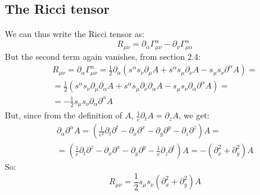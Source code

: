 \documentclass{article}
\begin{document}
\subsection{The Ricci tensor}
We can thus write the Ricci tensor as:
\begin{equation}
    R_{\mu\nu} =
    \partial_\alpha \Gamma^\alpha_{\mu\nu}
    - \partial_\nu \Gamma^\alpha_{\mu\alpha}
\end{equation}
But the second term again vanishes, from section 2.4:
\begin{equation}
\begin{gathered}
    R_{\mu\nu} = 
    \partial_\alpha \Gamma^\alpha_{\mu\nu}
    =
    \frac{1}{2}
    \partial_\alpha \left(
        s^\alpha s_\nu \partial_\mu A 
        + s^\alpha s_\mu \partial_\nu A 
        - s_\mu s_\nu \partial^\alpha A 
    \right) = \\ =
    \frac{1}{2}
    \left(
        s^\alpha s_\nu \partial_\mu \partial_\alpha A 
        + s^\alpha s_\mu \partial_\nu \partial_\alpha  A 
        - s_\mu s_\nu \partial_\alpha \partial^\alpha A 
    \right) = \\ =
    -\frac{1}{2} s_\mu s_\nu \partial_\alpha \partial^\alpha A 
\end{gathered}
\end{equation}
But, since from the definition of $A$, $\frac{1}{c}\partial_t A = \partial_z A$, we get:
\begin{equation}
\begin{gathered}
    \partial_\alpha \partial^\alpha A = \left(
        \frac{1}{c^2}\partial_t \partial^t - \partial_x \partial^x - \partial_y \partial^y - \partial_z \partial^z
    \right) A = \\ =
     \left(
        \frac{1}{c}\partial_t \partial^z - \partial_x \partial^x - \partial_y \partial^y - \frac{1}{c}\partial_z \partial^t
    \right) A = - \left(\partial_x^2 + \partial_y^2\right) A
\end{gathered}
\end{equation}
So:
\begin{equation}
    R_{\mu\nu} = \frac{1}{2}s_\mu s_\nu \left(\partial_x^2 + \partial_y^2\right) A
\end{equation}
\end{document}
